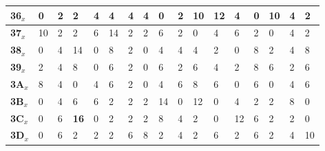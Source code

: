 \begin{longtable}[c]{|l|l|l|l|l|l|l|l|l|l|l|l|l|l|l|l|l|}
\textbf{36$_x$} & 0              & 2              & 2              & 4              & 4              & 4              & 4              & 0              & 2              & 10             & 12             & 4              & 0              & 10             & 4              & 2              \\ \hline
\textbf{37$_x$} & 10             & 2              & 2              & 6              & 14             & 2              & 2              & 6              & 2              & 0              & 4              & 6              & 2              & 0              & 4              & 2              \\ \hline
\textbf{38$_x$} & 0              & 4              & 14             & 0              & 8              & 2              & 0              & 4              & 4              & 4              & 2              & 0              & 8              & 2              & 4              & 8              \\ \hline
\textbf{39$_x$} & 2              & 4              & 8              & 0              & 6              & 2              & 0              & 6              & 2              & 6              & 4              & 2              & 8              & 6              & 2              & 6              \\ \hline
\textbf{3A$_x$} & 8              & 4              & 0              & 4              & 6              & 2              & 0              & 4              & 6              & 8              & 6              & 0              & 6              & 0              & 4              & 6              \\ \hline
\textbf{3B$_x$} & 0              & 4              & 6              & 6              & 2              & 2              & 2              & 14             & 0              & 12             & 0              & 4              & 2              & 2              & 8              & 0              \\ \hline
\textbf{3C$_x$} & 0              & 6              & \textbf{16}             & 0              & 2              & 2              & 2              & 8              & 4              & 2              & 0              & 12             & 6              & 2              & 2              & 0              \\ \hline
\textbf{3D$_x$} & 0              & 6              & 2              & 2              & 2              & 6              & 8              & 2              & 4              & 2              & 6              & 2              & 6              & 2              & 4              & 10             \\ \hline

\end{longtable}
